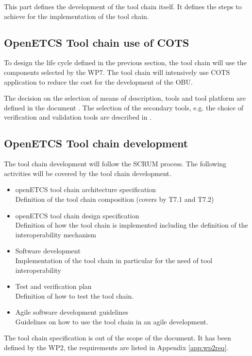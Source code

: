 This part defines the development of the tool chain itself. It defines
the steps to achieve for the implementation of the tool chain.

\subsection{OpenETCS Tool chain use of \gls{COTS}}
To design the life cycle defined in the previous section, the tool chain will
use the components selected by the WP7.  The tool chain will intensively use 
\gls{COTS} application to reduce   the cost for the development of the
\gls{OBU}.

The decision on the selection of means of description, tools and tool platform
are defined in the document \cite{D7.1}. The selection of the secondary tools,
e.g. the choice of verification and validation tools are described in \cite{}.

\subsection{OpenETCS Tool chain development}
The tool chain development will follow the SCRUM process.
The following activities will be covered  by the tool chain development.
\begin{itemize}
\item openETCS tool chain architecture specification\\
Definition of the tool chain composition (covers by T7.1 \cite{D7.1} and T7.2)
\item openETCS tool chain design specification \\
Definition of how the tool chain is implemented including the
definition of the interoperability mechanism
\item Software development\\
Implementation of the tool chain in particular for the need of tool interoperability
\item Test and verification plan\\
Definition of how to test the tool chain.
\item Agile software development guidelines\\
Guidelines on how to use the tool chain in an agile development.
\end{itemize}

The tool chain specification is out of the scope of the document. It
has been defined by the WP2, the requirements are listed in Appendix \ref{app:wp2req}.
 	

